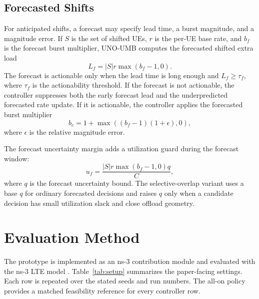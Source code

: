 \documentclass[10pt,twocolumn]{article}
\begin{document}
\subsection{Forecasted Shifts}

For anticipated shifts, a forecast may specify lead time, a burst magnitude,
and a magnitude error.  If $S$ is the set of shifted UEs, $r$ is the per-UE
base rate, and $b_f$ is the forecast burst multiplier, UNO-UMB computes the
forecasted shifted extra load
\begin{equation}
  L_f = |S|r\max(b_f-1,0).
\end{equation}
The forecast is actionable only when the lead time is long enough and
$L_f \geq \tau_f$, where $\tau_f$ is the actionability threshold.  If the
forecast is not actionable, the controller suppresses both the early forecast
lead and the underpredicted forecasted rate update.  If it is actionable, the
controller applies the forecasted burst multiplier
\begin{equation}
  b_c = 1 + \max((b_f-1)(1+\epsilon),0),
\end{equation}
where $\epsilon$ is the relative magnitude error.

The forecast uncertainty margin adds a utilization guard during the forecast
window:
\begin{equation}
  u_f=\frac{|S|r\max(b_f-1,0)q}{C},
\end{equation}
where $q$ is the forecast uncertainty bound.  The selective-overlap variant
uses a base $q$ for ordinary forecasted decisions and raises $q$ only when a
candidate decision has small utilization slack and close offload geometry.

\section{Evaluation Method}

The prototype is implemented as an ns-3 contribution module and evaluated with
the ns-3 LTE model \cite{baldo2011lte}.  Table~\ref{tab:setup} summarizes the
paper-facing settings.  Each row is repeated over the stated seeds and run
numbers.  The all-on policy provides a matched feasibility reference for every
controller row.
\end{document}
